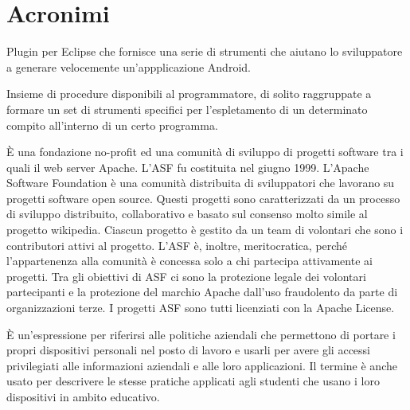 {}
\section*{Acronimi}
\begin{acronym}[HTML5]
	
	{\small Plugin per Eclipse che fornisce una serie di strumenti che aiutano lo sviluppatore a generare velocemente un'appplicazione Android. \par}
	
	
	{\small Insieme di procedure disponibili al programmatore, di solito raggruppate a formare un set di strumenti specifici per l'espletamento di un determinato compito all'interno di un certo programma. \par}
	
	
	{\small È una fondazione no-profit ed una comunità di sviluppo di progetti software tra i quali il web server Apache. L'ASF fu costituita nel giugno 1999. L'Apache Software Foundation è una comunità distribuita di sviluppatori che lavorano su progetti software open source. Questi progetti sono caratterizzati da un processo di sviluppo distribuito, collaborativo e basato sul consenso molto simile al progetto wikipedia. Ciascun progetto è gestito da un team di volontari che sono i contributori attivi al progetto. L'ASF è, inoltre, meritocratica, perché l'appartenenza alla comunità è concessa solo a chi partecipa attivamente ai progetti. Tra gli obiettivi di ASF ci sono la protezione legale dei volontari partecipanti e la protezione del marchio Apache dall'uso fraudolento da parte di organizzazioni terze. I progetti ASF sono tutti licenziati con la Apache License. \par}
	
	
	{\small È un'espressione per riferirsi alle politiche aziendali che permettono di portare i propri dispositivi personali nel posto di lavoro e usarli per avere gli accessi privilegiati alle informazioni aziendali e alle loro applicazioni. Il termine è anche usato per descrivere le stesse pratiche applicati agli studenti che usano i loro dispositivi in ambito educativo. \par}


\end{acronym}
